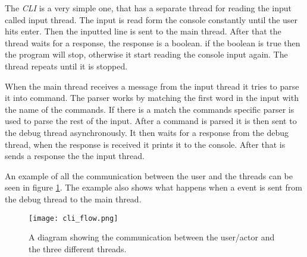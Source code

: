 The \emph{CLI} is a very simple one, that has a separate thread for reading the input called input thread.
The input is read form the console constantly until the user hits enter.
Then the inputted line is sent to the main thread.
After that the thread waits for a response, the response is a boolean.
if the boolean is true then the program will stop, otherwise it start reading the console input again.
The thread repeats until it is stopped.


When the main thread receives a message from the input thread it tries to parse it into command.
The parser works by matching the first word in the input with the name of the commands.
If there is a match the commands specific parser is used to parse the rest of the input.
After a command is parsed it is then sent to the debug thread asynchronously.
It then waits for a response from the debug thread, when the response is received it prints it to the console.
After that is sends a response the the input thread.


An example of all the communication between the user and the threads can be seen in figure \ref{fig:cliflow}.
The example also shows what happens when a event is sent from the debug thread to the main thread.


\begin{figure}[h]
	\centering
	\texttt{[image: cli\_flow.png]}
	\caption{A diagram showing the communication between the user/actor and the three different threads.}
	\label{fig:cliflow}
\end{figure}


